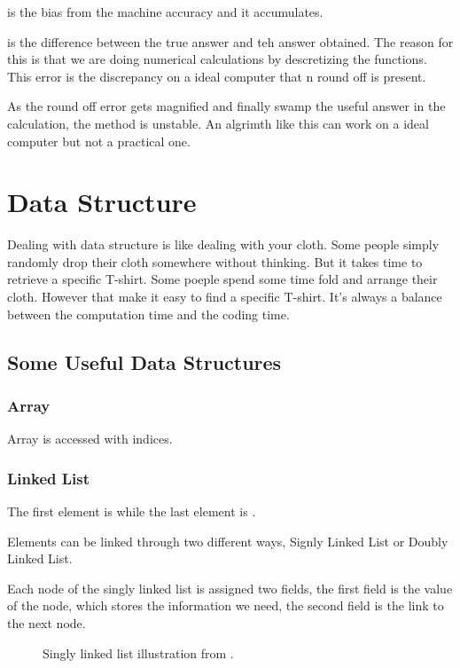 \documentclass[letterpaper,12pt,english]{sphinxmanual}
\begin{document}
 is the bias from the machine accuracy and it accumulates.

 is the difference between  the true answer and teh answer obtained. The reason for this is that we are doing numerical calculations by descretizing the functions. This error is the discrepancy on a ideal computer that n round off is present.

As the round off error gets magnified and finally swamp the useful answer in the calculation, the method is unstable. An algrimth like this can work on a ideal computer but not a practical one.


\section{Data Structure}
\label{\detokenize{preliminary/data-structure::doc}}\label{\detokenize{preliminary/data-structure:id1}}\label{\detokenize{preliminary/data-structure:data-structure}}
Dealing with data structure is like dealing with your cloth. Some people simply randomly drop their cloth somewhere without thinking. But it takes time to retrieve a specific T-shirt. Some poeple spend some time fold and arrange their cloth. However that make it easy to find a specific T-shirt. It's always a balance between the computation time and the coding time.


\subsection{Some Useful Data Structures}
\label{\detokenize{preliminary/data-structure:some-useful-data-structures}}

\subsubsection{Array}
\label{\detokenize{preliminary/data-structure:array}}
Array is accessed with indices.


\subsubsection{Linked List}
\label{\detokenize{preliminary/data-structure:linked-list}}
The first element is  while the last element is .

Elements can be linked through two different ways, Signly Linked List or Doubly Linked List.

Each node of the singly linked list is assigned two fields, the first field is the value of the node, which stores the information we need, the second field is the link to the next node.
\begin{figure}[htbp]
\centering
\capstart

\noindent{}
\caption{Singly linked list illustration from .}\label{\detokenize{preliminary/data-structure:id2}}\end{figure}
\end{document}
